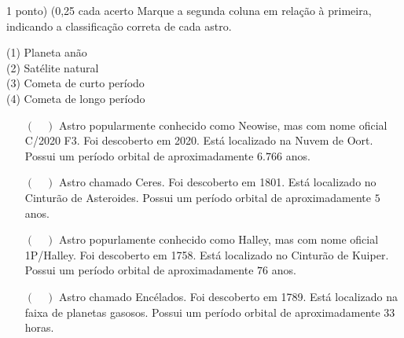 \documentclass{../lista}
\begin{document}
	\begin{questao}{1 ponto) (0,25 cada acerto}
		Marque a segunda coluna em relação à primeira, indicando a classificação correta de cada astro.
		\begin{multicols}{2}
			\vfill\null \vfill\null
			\begin{flushleft}
				(1) Planeta anão \\
				(2) Satélite natural \\
				(3) Cometa de curto período \\
				(4) Cometa de longo período
			\end{flushleft}
			\vfill\null \vfill\null
			\columnbreak
			\begin{itemize}
				\item[$(\quad)$] Astro popularmente conhecido como Neowise, mas com nome oficial C/2020 F3. Foi descoberto em 2020. Está localizado na Nuvem de Oort. Possui um período orbital de aproximadamente $6.766$ anos.
				\item[$(\quad)$] Astro chamado Ceres. Foi descoberto em 1801. Está localizado no Cinturão de Asteroides. Possui um período orbital de aproximadamente $5$ anos.
				\item[$(\quad)$] Astro popurlamente conhecido como Halley, mas com nome oficial 1P/Halley. Foi descoberto em 1758. Está localizado no Cinturão de Kuiper. Possui um período orbital de aproximadamente $76$ anos.
				\item[$(\quad)$] Astro chamado Encélados. Foi descoberto em 1789. Está localizado na faixa de planetas gasosos. Possui um período orbital de aproximadamente 33 horas.
			\end{itemize}
		\end{multicols}
	\end{questao}
\end{document}
